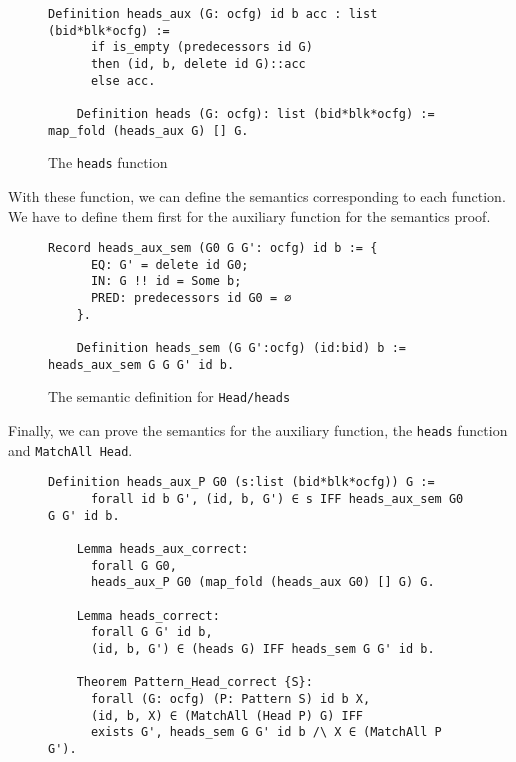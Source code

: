 \documentclass[11pt]{article}
\newcommand{\inlinecoq}[1]{\mbox{\lstinline[style=customcoq,columns=fixed,basewidth=.48em]{#1}}}
\newcommand{\ilc}[1]{\inlinecoq{#1}}
\begin{document}
\begin{figure}[H]
  \begin{lstlisting}[style=customcoq,basicstyle=\small\ttfamily]
    Definition heads_aux (G: ocfg) id b acc : list (bid*blk*ocfg) :=
      if is_empty (predecessors id G)
      then (id, b, delete id G)::acc
      else acc.

    Definition heads (G: ocfg): list (bid*blk*ocfg) := map_fold (heads_aux G) [] G.
  \end{lstlisting}
  \caption{The \ilc{heads} function}
  \label{fig:heads_fun}
\end{figure}

With these function, we can define the semantics corresponding to each function. We have to define them first for the auxiliary function for the semantics proof.

\begin{figure}[H]
  \begin{lstlisting}[style=customcoq,basicstyle=\small\ttfamily]
    Record heads_aux_sem (G0 G G': ocfg) id b := {
      EQ: G' = delete id G0;
      IN: G !! id = Some b;
      PRED: predecessors id G0 = ∅
    }.

    Definition heads_sem (G G':ocfg) (id:bid) b := heads_aux_sem G G G' id b.
  \end{lstlisting}
  \caption{The semantic definition for \ilc{Head/heads}}
  \label{fig:sem_block_def}
\end{figure}

Finally, we can prove the semantics for the auxiliary function, the \ilc{heads} function and \ilc{MatchAll Head}.

\begin{figure}[H]
  \label{fig:block_cor}
  \begin{lstlisting}[style=customcoq,basicstyle=\small\ttfamily]
    Definition heads_aux_P G0 (s:list (bid*blk*ocfg)) G :=
      forall id b G', (id, b, G') ∈ s IFF heads_aux_sem G0 G G' id b.

    Lemma heads_aux_correct:
      forall G G0,
      heads_aux_P G0 (map_fold (heads_aux G0) [] G) G.

    Lemma heads_correct:
      forall G G' id b,
      (id, b, G') ∈ (heads G) IFF heads_sem G G' id b.

    Theorem Pattern_Head_correct {S}:
      forall (G: ocfg) (P: Pattern S) id b X,
      (id, b, X) ∈ (MatchAll (Head P) G) IFF
      exists G', heads_sem G G' id b /\ X ∈ (MatchAll P G').
  \end{lstlisting}
\end{figure}
\end{document}
